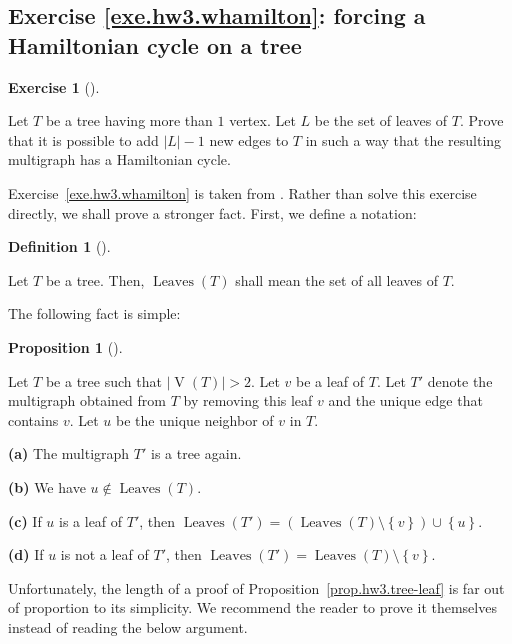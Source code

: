 \documentclass[numbers=enddot,12pt,final,onecolumn,notitlepage]{scrartcl}%
\newcounter{exer}
\theoremstyle{definition}
\newtheorem{prop}[theo]{Proposition}
\newenvironment{proposition}[1][]
{\begin{prop}[#1]\begin{leftbar}}
{\end{leftbar}\end{prop}}
\newtheorem{defi}[theo]{Definition}
\newenvironment{definition}[1][]
{\begin{defi}[#1]\begin{leftbar}}
{\end{leftbar}\end{defi}}
\newtheorem{exmp}[exer]{Exercise}
\newenvironment{exercise}[1][]
{\begin{exmp}[#1]\begin{leftbar}}
{\end{leftbar}\end{exmp}}
\newcommand{\set}[1]{\left\{ #1 \right\}}
\newcommand{\abs}[1]{\left| #1 \right|}
\newcommand{\tup}[1]{\left( #1 \right)}
\newcommand{\verts}[1]{\operatorname{V}\left( #1 \right)}
\newcommand{\leaves}[1]{\operatorname{Leaves}\left( #1 \right)}
\begin{document}
\subsection{Exercise \ref{exe.hw3.whamilton}: forcing a Hamiltonian
cycle on a tree}

\begin{exercise} \label{exe.hw3.whamilton}
Let $T$ be a tree having more than $1$ vertex.
Let $L$ be the set of leaves of $T$.
Prove that it
is possible to add $\abs{L}-1$ new edges to $T$ in such a way that
the resulting multigraph has a Hamiltonian cycle.
\end{exercise}

Exercise~\ref{exe.hw3.whamilton} is taken from
\cite[Lemma 3.1, second inequality sign]{Wang17}.
Rather than solve this exercise directly, we shall prove a stronger
fact.
First, we define a notation:

\begin{definition}
Let $T$ be a tree.
Then, $\leaves{T}$ shall mean the set of all leaves of $T$.
\end{definition}

The following fact is simple:

\begin{proposition} \label{prop.hw3.tree-leaf}
Let $T$ be a tree such that $\abs{\verts{T}} > 2$.
Let $v$ be a leaf of $T$.
Let $T'$ denote the multigraph obtained from $T$ by
removing this leaf $v$ and the unique edge that contains $v$.
Let $u$ be the unique neighbor of $v$ in $T$.

\textbf{(a)} The multigraph $T'$ is a tree again.

\textbf{(b)} We have $u \notin \leaves{T}$.

\textbf{(c)} If $u$ is a leaf of $T'$, then
$\leaves{T'} = \tup{\leaves{T} \setminus \set{v}} \cup \set{u}$.

\textbf{(d)} If $u$ is not a leaf of $T'$, then
$\leaves{T'} = \leaves{T} \setminus \set{v}$.
\end{proposition}

Unfortunately, the length of a proof of
Proposition~\ref{prop.hw3.tree-leaf} is far out of proportion to its
simplicity.
We recommend the reader to prove it themselves instead of reading the
below argument.
\end{document}
